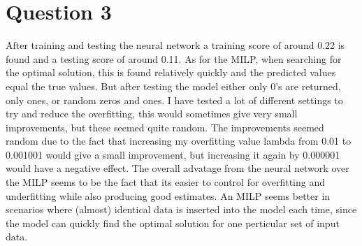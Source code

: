 \section{Question 3}
After training and testing the neural network a training score of around 0.22 is found and a testing score of around 0.11. As for the MILP, when searching for the optimal solution, this is found relatively quickly and the predicted values equal the true values. But after testing the model either only 0's are returned, only ones, or random zeros and ones. I have tested a lot of different settings to try and reduce the overfitting, this would sometimes give very small improvements, but these seemed quite random. The improvements seemed random due to the fact that increasing my overfitting value lambda from 0.01 to 0.001001 would give a small improvement, but increasing it again by 0.000001 would have a negative effect. The overall advatage from the neural network over the MILP seems to be the fact that its easier to control for overfitting and underfitting while also producing good estimates. An MILP seems better in scenarios where (almost) identical data is inserted into the model each time, since the model can quickly find the optimal solution for one perticular set of input data.

